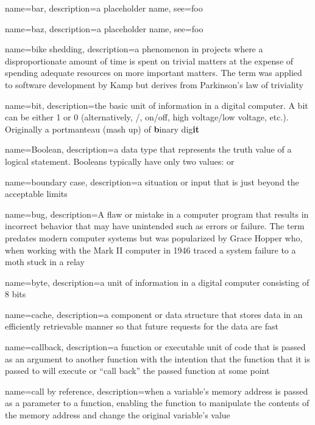 {
  name=bar,
  description={a placeholder name},
  see={foo}
}

{
  name=baz,
  description={a placeholder name},
  see={foo}
}

{
  name=bike shedding,
  description={a phenomenon in projects where a disproportionate amount of time is spent on trivial matters at the expense of spending adequate resources on more important matters.  The term was applied to software development by Kamp \cite{bikeShed99} but derives from Parkinson's law of triviality \cite{Parkinson58}}
}

{
  name=bit,
  description={the basic unit of information in a digital computer.  A bit can be either 1 or 0 (alternatively, \True/\False, 
  	on/off, high voltage/low voltage, etc.).  Originally a portmanteau (mash up) of \textbf{b}inary dig\textbf{it}}
}

{
  name=Boolean,
  description={a data type that represents the truth value of a logical statement.  Booleans typically have only two 
  	values: \True or \False}
}

{
  name=boundary case,
  description={a situation or input that is just beyond the acceptable limits}
}

{
  name=bug,
  description={A flaw or mistake in a computer program that results in incorrect behavior that may have unintended such as errors or failure.  The
  	term predates modern computer systems but was popularized by Grace Hopper who, when working with the Mark II computer in 1946 traced
  	a system failure to a moth stuck in a relay}
}

{
  name=byte,
  description={a unit of information in a digital computer consisting of 8 bits}
}

{
  name=cache,
  description={a component or data structure that stores data in an efficiently retrievable manner so that future requests for the data are fast}
}

{
  name=callback,
  description={a function or executable unit of code that is passed as an argument to another function with the intention that the function that it is passed to will execute or ``call back'' the passed function at some point}
}

{
  name=call by reference,
  description={when a variable's memory address is passed as a parameter to a function, enabling the function to manipulate the contents of the memory address and change the original variable's value}
}

